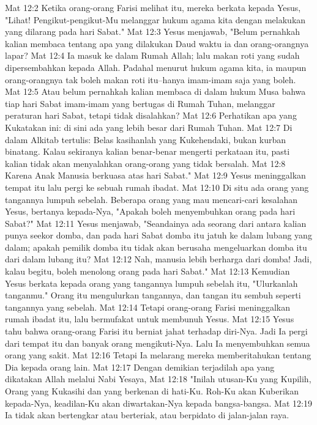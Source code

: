 Mat 12:2  Ketika orang-orang Farisi melihat itu, mereka berkata kepada Yesus, "Lihat! Pengikut-pengikut-Mu melanggar hukum agama kita dengan melakukan yang dilarang pada hari Sabat."
Mat 12:3  Yesus menjawab, "Belum pernahkah kalian membaca tentang apa yang dilakukan Daud waktu ia dan orang-orangnya lapar?
Mat 12:4  Ia masuk ke dalam Rumah Allah; lalu makan roti yang sudah dipersembahkan kepada Allah. Padahal menurut hukum agama kita, ia maupun orang-orangnya tak boleh makan roti itu--hanya imam-imam saja yang boleh.
Mat 12:5  Atau belum pernahkah kalian membaca di dalam hukum Musa bahwa tiap hari Sabat imam-imam yang bertugas di Rumah Tuhan, melanggar peraturan hari Sabat, tetapi tidak disalahkan?
Mat 12:6  Perhatikan apa yang Kukatakan ini: di sini ada yang lebih besar dari Rumah Tuhan.
Mat 12:7  Di dalam Alkitab tertulis: Belas kasihanlah yang Kukehendaki, bukan kurban binatang. Kalau sekiranya kalian benar-benar mengerti perkataan itu, pasti kalian tidak akan menyalahkan orang-orang yang tidak bersalah.
Mat 12:8  Karena Anak Manusia berkuasa atas hari Sabat."
Mat 12:9  Yesus meninggalkan tempat itu lalu pergi ke sebuah rumah ibadat.
Mat 12:10  Di situ ada orang yang tangannya lumpuh sebelah. Beberapa orang yang mau mencari-cari kesalahan Yesus, bertanya kepada-Nya, "Apakah boleh menyembuhkan orang pada hari Sabat?"
Mat 12:11  Yesus menjawab, "Seandainya ada seorang dari antara kalian punya seekor domba, dan pada hari Sabat domba itu jatuh ke dalam lubang yang dalam; apakah pemilik domba itu tidak akan berusaha mengeluarkan domba itu dari dalam lubang itu?
Mat 12:12  Nah, manusia lebih berharga dari domba! Jadi, kalau begitu, boleh menolong orang pada hari Sabat."
Mat 12:13  Kemudian Yesus berkata kepada orang yang tangannya lumpuh sebelah itu, "Ulurkanlah tanganmu." Orang itu mengulurkan tangannya, dan tangan itu sembuh seperti tangannya yang sebelah.
Mat 12:14  Tetapi orang-orang Farisi meninggalkan rumah ibadat itu, lalu bermufakat untuk membunuh Yesus.
Mat 12:15  Yesus tahu bahwa orang-orang Farisi itu berniat jahat terhadap diri-Nya. Jadi Ia pergi dari tempat itu dan banyak orang mengikuti-Nya. Lalu Ia menyembuhkan semua orang yang sakit.
Mat 12:16  Tetapi Ia melarang mereka memberitahukan tentang Dia kepada orang lain.
Mat 12:17  Dengan demikian terjadilah apa yang dikatakan Allah melalui Nabi Yesaya,
Mat 12:18  "Inilah utusan-Ku yang Kupilih, Orang yang Kukasihi dan yang berkenan di hati-Ku. Roh-Ku akan Kuberikan kepada-Nya, keadilan-Ku akan diwartakan-Nya kepada bangsa-bangsa.
Mat 12:19  Ia tidak akan bertengkar atau berteriak, atau berpidato di jalan-jalan raya.
